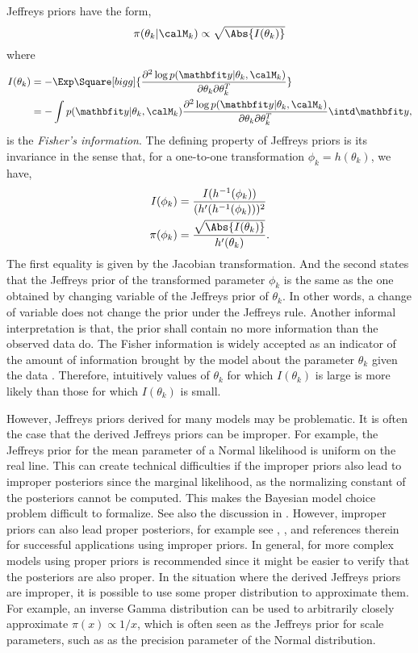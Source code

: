 Jeffreys priors \cite{Jeffreys:1946jf} have the form,
\begin{equation}
  \pi(\theta_k|\calM_k)\propto\sqrt{\Abs{I(\theta_k)}}
\end{equation}
where
\begin{align}
  I(\theta_k)
  &= -\Exp\Square[bigg]{\frac{\partial^2\log p(\data|\theta_k,\calM_k)}
    {\partial\theta_k\partial\theta_k^T}} \notag\\
  &= -\int p(\data|\theta_k,\calM_k)
  \frac{\partial^2\log p (\data|\theta_k,\calM_k)}
  {\partial\theta_k\partial\theta_k^T}\intd\data,
\end{align}
is the \emph{Fisher's information}. The defining property of Jeffreys priors
is its invariance in the sense that, for a one-to-one transformation $\phi_k =
h(\theta_k)$, we have,
\begin{align*}
  I(\phi_k) &= \frac{I(h^{-1}(\phi_k))}{(h'(h^{-1}(\phi_k)))^2} \\
  \pi(\phi_k) &= \frac{\sqrt{\Abs{I(\theta_k)}}}{h'(\theta_k)}.
\end{align*}
The first equality is given by the Jacobian transformation. And the second
states that the Jeffreys prior of the transformed parameter $\phi_k$ is the
same as the one obtained by changing variable of the Jeffreys prior of
$\theta_k$. In other words, a change of variable does not change the prior
under the Jeffreys rule. Another informal interpretation is that, the prior
shall contain no more information than the observed data do. The Fisher
information is widely accepted as an indicator of the amount of information
brought by the model about the parameter $\theta_k$ given the data
\cite{Fisher:1956vx}. Therefore, intuitively values of $\theta_k$ for which
$I(\theta_k)$ is large is more likely than those for which $I(\theta_k)$ is
small.

However, Jeffreys priors derived for many models may be problematic. It is
often the case that the derived Jeffreys priors can be improper. For example,
the Jeffreys prior for the mean parameter of a Normal likelihood is uniform on
the real line. This can create technical difficulties if the improper priors
also lead to improper posteriors since the marginal likelihood, as the
normalizing constant of the posteriors cannot be computed. This makes the
Bayesian model choice problem difficult to formalize. See also the discussion
in \cite{Kass:1995vb}. However, improper priors can also lead proper
posteriors, for example see \cite[][sec.~2.9]{Gelman:2003vx},
\cite[][sec.~1.5]{Robert:2007tc}, \cite{Kass:1995vb} and references therein
for successful applications using improper priors. In general, for more
complex models using proper priors is recommended since it might be easier to
verify that the posteriors are also proper. In the situation where the derived
Jeffreys priors are improper, it is possible to use some proper distribution
to approximate them. For example, an inverse Gamma distribution can be used to
arbitrarily closely approximate $\pi(x)\propto1/x$, which is often seen as the
Jeffreys prior for scale parameters, such as as the precision parameter of the
Normal distribution.

